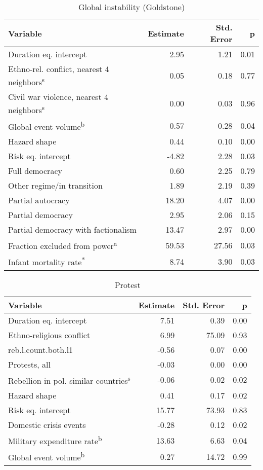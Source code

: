 \begin{table}[ht]
\centering
\caption{Global instability (Goldstone)} 
\label{theme3}
\begin{tabular}{p{3in}rrr}
  \toprule
Variable & Estimate & Std. Error & p \\ 
  \midrule
Duration eq. intercept & 2.95 & 1.21 & 0.01 \\ 
  Ethno-rel. conflict, nearest 4 neighbors\textsuperscript{s} & 0.05 & 0.18 & 0.77 \\ 
  Civil war violence, nearest 4 neighbors\textsuperscript{s} & 0.00 & 0.03 & 0.96 \\ 
  Global event volume\textsuperscript{b} & 0.57 & 0.28 & 0.04 \\ 
  Hazard shape & 0.44 & 0.10 & 0.00 \\ 
  \midrule Risk eq. intercept & -4.82 & 2.28 & 0.03 \\ 
  Full democracy & 0.60 & 2.25 & 0.79 \\ 
  Other regime/in transition & 1.89 & 2.19 & 0.39 \\ 
  Partial autocracy & 18.20 & 4.07 & 0.00 \\ 
  Partial democracy & 2.95 & 2.06 & 0.15 \\ 
  Partial democracy with factionalism & 13.47 & 2.97 & 0.00 \\ 
  Fraction excluded from power\textsuperscript{a} & 59.53 & 27.56 & 0.03 \\ 
  Infant mortality rate\textsuperscript{*} & 8.74 & 3.90 & 0.03 \\ 
   \bottomrule
\end{tabular}
\end{table}

\begin{table}[ht]
\centering
\caption{Protest} 
\label{theme4}
\begin{tabular}{p{3in}rrr}
  \toprule
Variable & Estimate & Std. Error & p \\ 
  \midrule
Duration eq. intercept & 7.51 & 0.39 & 0.00 \\ 
  Ethno-religious conflict & 6.99 & 75.09 & 0.93 \\ 
  reb.l.count.both.l1 & -0.56 & 0.07 & 0.00 \\ 
  Protests, all & -0.03 & 0.00 & 0.00 \\ 
  Rebellion in pol. similar countries\textsuperscript{s} & -0.06 & 0.02 & 0.02 \\ 
  Hazard shape & 0.41 & 0.17 & 0.02 \\ 
  \midrule Risk eq. intercept & 15.77 & 73.93 & 0.83 \\ 
  Domestic crisis events & -0.28 & 0.12 & 0.02 \\ 
  Military expenditure rate\textsuperscript{b} & 13.63 & 6.63 & 0.04 \\ 
  Global event volume\textsuperscript{b} & 0.27 & 14.72 & 0.99 \\ 
   \bottomrule
\end{tabular}
\end{table}

